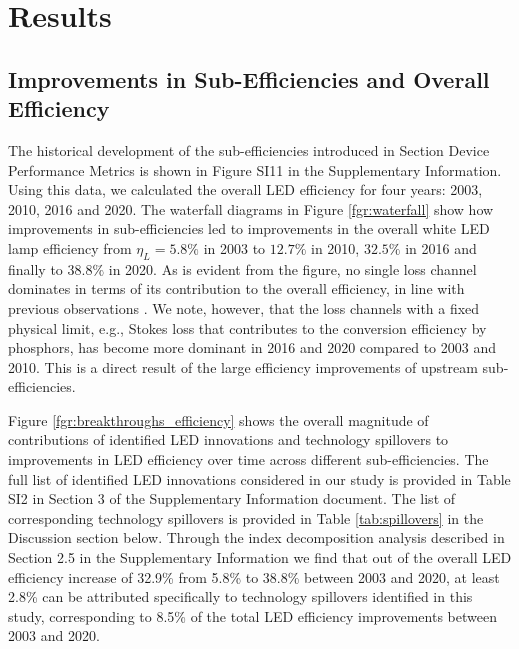 \documentclass[parskip=full]{article}
\begin{document}
\section{Results}

\subsection{Improvements in Sub-Efficiencies and Overall Efficiency}

The historical development of the sub-efficiencies introduced in Section Device Performance Metrics is shown in Figure SI11 in the Supplementary Information. Using this data, we calculated the overall LED efficiency for four years: 2003, 2010, 2016 and 2020. The waterfall diagrams in Figure \ref{fgr:waterfall} show how improvements in sub-efficiencies led to improvements in the overall white LED lamp efficiency from $\eta_L=5.8\%$ in 2003 to $12.7\%$ in 2010, $32.5\%$ in 2016 and finally to $38.8\%$ in 2020. As is evident from the figure, no single loss channel dominates in terms of its contribution to the overall efficiency, in line with previous observations \cite{tsao2010solid}. We note, however, that the loss channels with a fixed physical limit, e.g., Stokes loss that contributes to the conversion efficiency by phosphors, has become more dominant in 2016 and 2020 compared to 2003 and 2010. This is a direct result of the large efficiency improvements of upstream sub-efficiencies.

Figure \ref{fgr:breakthroughs_efficiency} shows the overall magnitude of contributions of identified LED innovations and technology spillovers to improvements in LED efficiency over time across different sub-efficiencies. The full list of identified LED innovations considered in our study is provided in Table SI2 in Section 3 of the Supplementary Information document. The list of corresponding technology spillovers is provided in Table \ref{tab:spillovers} in the Discussion section below. Through the index decomposition analysis described in Section 2.5 in the Supplementary Information we find that out of the overall LED efficiency increase of 32.9\% from 5.8\% to 38.8\% between 2003 and 2020, at least 2.8\% can be attributed specifically to technology spillovers identified in this study, corresponding to 8.5\% of the total LED efficiency improvements between 2003 and 2020.
\end{document}
